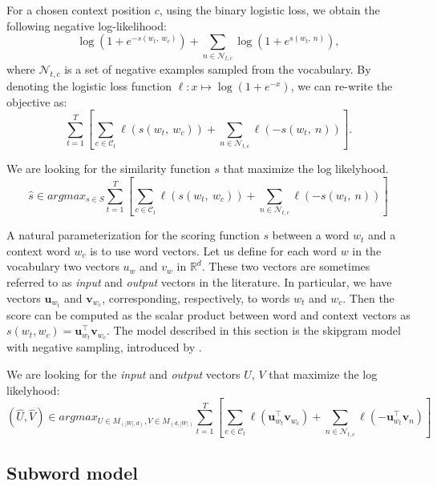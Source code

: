 For a chosen context position $c$, using the binary logistic loss, we obtain the following negative log-likelihood:
\begin{equation*}
  \log \left(1 + e^{-s(w_t,\ w_c)} \right) + \sum_{n \in \mathcal{N}_{t, c}} \log \left(1 + e^{s(w_t,\ n)}\right),
\end{equation*}
where $\mathcal{N}_{t,c}$ is a set of negative examples sampled from the vocabulary.
By denoting the logistic loss function $\ell: x \mapsto \log(1 + e^{-x})$, we can re-write the objective as:
\begin{equation*}
\sum_{t=1}^{T}  \left [ \sum_{c \in \mathcal{C}_t} \ell(s(w_t,\ w_c)) + \sum_{n \in \mathcal{N}_{t,c}} \ell(-s(w_t,\ n)) \right ].
\end{equation*}




We are looking for the similarity function $s$ that maximize the log likelyhood.
\begin{equation*}
	\hat s \in argmax_{s\in S} \sum_{t=1}^{T}  \left [ \sum_{c \in \mathcal{C}_t} \ell(s(w_t,\ w_c)) + \sum_{n \in \mathcal{N}_{t,c}} \ell(-s(w_t,\ n)) \right ]
\end{equation*}




A natural parameterization for the scoring function $s$ between a word $w_t$ and a context word $w_c$ is to use word vectors.
Let us define for each word $w$ in the vocabulary two vectors $u_w$ and $v_w$ in $\mathbb{R}^d$.
These two vectors are sometimes referred to as \emph{input} and \emph{output} vectors in the literature.
In particular, we have vectors $\mathbf{u}_{w_t}$ and $\mathbf{v}_{w_c}$, corresponding, respectively, to words $w_t$ and $w_c$.
Then the score can be computed as the scalar product between word and context vectors as $s(w_t, w_c) = \mathbf{u}_{w_t}^{\top} \mathbf{v}_{w_c}$.
The model described in this section is the skipgram model with negative sampling, introduced by .

We are looking for the \emph{input} and \emph{output} vectors $U$, $V$ that maximize the log likelyhood:
\begin{equation*}
	(\hat U, \hat V) \in argmax_{U \in M_{(|W|, d)}, V \in M_{(d, |W|)} } \sum_{t=1}^{T}  \left [ \sum_{c \in \mathcal{C}_t} \ell(\mathbf{u}_{w_t}^{\top} \mathbf{v}_{w_c}) + \sum_{n \in \mathcal{N}_{t,c}} \ell(-\mathbf{u}_{w_t}^{\top} \mathbf{v}_{n}) \right ]
\end{equation*}


\subsection{Subword model}
\label{sec:model-ngrams}

